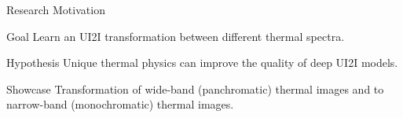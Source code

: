 \begin{frame}{Research Motivation}
  \begin{exampleblock}{Goal}
    Learn an UI2I transformation between different thermal spectra.
  \end{exampleblock} 
  \begin{exampleblock}{Hypothesis}
    Unique thermal physics can improve the quality of deep UI2I models.
  \end{exampleblock}  
  \begin{exampleblock}{Showcase}
    Transformation of wide-band (panchromatic) thermal images and to narrow-band (monochromatic) thermal images.
  \end{exampleblock}
\end{frame}